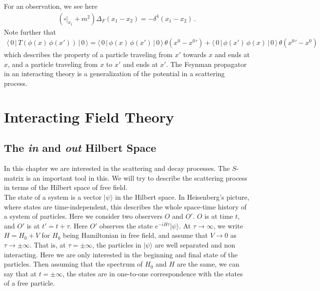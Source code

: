 \documentclass[11pt, onesided]{book}
\theoremstyle{break}
\theoremstyle{break}
\begin{document}
For an observation, we see here
\begin{align*}
(\square|_{x_1} + m^2)\Delta_F(x_1 - x_2) = -\delta^4(x_1 - x_2)\,.
\end{align*}
Note further that
\begin{align*}
\langle \,0\, |\, T(\phi(x)\,\phi(x'))\,|\,0\,\rangle = 
\langle\, 0\, |\, \phi(x) \,\phi(x')\,|\,0\,\rangle\, \theta(x^0 - {x^0}')
+
\langle\, 0\, |\, \phi(x')\, \phi(x)\, |\, 0\,\rangle\, \theta({x^0}' - x^0)
\end{align*}
which describes the property of a particle traveling from $x'$ towards $x$ and ends at $x$, and a particle traveling from $x$ to $x'$ and ends at $x'$. The Feynman propagator in an interacting theory is a generalization of the potential in a scattering process. \\

\newpage
\chapter{Interacting Field Theory}
\section[The \textit{in} and \textit{out} Hilbert Space]{\color{red}The \textit{in} and \textit{out} Hilbert Space\color{black}}
In this chapter we are interested in the scattering and decay processes. The $S$-matrix is an important tool in this. We will try to describe the scattering process in terms of the Hilbert space of free field.\\

The state of a system is a vector $|\psi\rangle$ in the Hilbert space. In Heisenberg's picture, where states are time-independent, this describes the whole space-time history of a system of particles. Here we consider two observers $O$ and $O'$. $O$ is at time $t$, and $O'$ is at $t' = t+\tau$. Here $O'$ observes the state $e^{-iH\tau}|\psi\rangle$. At $\tau \to \infty$, we write $H = H_0 + V$ for $H_0$ being Hamiltonian in free field, and assume that $V\to 0$ as $\tau \to\pm \infty$. That is, at $\tau = \pm \infty$, the particles in $|\psi\rangle$ are well separated and non interacting. Here we are only interested in the beginning and  final state of the particles. Then assuming that the spectrum of $H_0$ and $H$ are the same, we can say that at $t = \pm \infty$, the states are in one-to-one correspondence with the states of a free particle. \\
\end{document}
